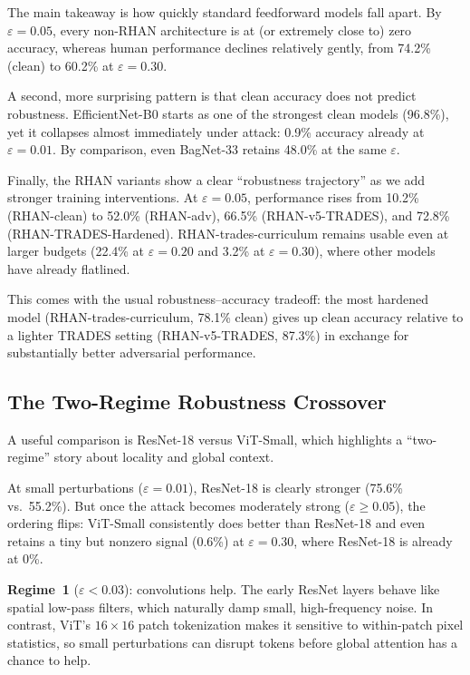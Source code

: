 \documentclass[12pt,a4paper]{article}
\begin{document}
The main takeaway is how quickly standard feedforward models fall apart.
By $\varepsilon{=}0.05$, every non-RHAN architecture is at (or extremely close to)
zero accuracy, whereas human performance declines relatively gently, from 74.2\%
(clean) to 60.2\% at $\varepsilon{=}0.30$.

A second, more surprising pattern is that clean accuracy does not predict
robustness. EfficientNet-B0 starts as one of the strongest clean models (96.8\%),
yet it collapses almost immediately under attack: 0.9\% accuracy already at
$\varepsilon{=}0.01$. By comparison, even BagNet-33 retains 48.0\% at the same
$\varepsilon$.

Finally, the RHAN variants show a clear ``robustness trajectory'' as we add
stronger training interventions. At $\varepsilon{=}0.05$, performance rises from
10.2\% (RHAN-clean) to 52.0\% (RHAN-adv), 66.5\% (RHAN-v5-TRADES), and 72.8\%
(RHAN-TRADES-Hardened). RHAN-trades-curriculum remains usable even at larger
budgets (22.4\% at $\varepsilon{=}0.20$ and 3.2\% at $\varepsilon{=}0.30$), where
other models have already flatlined.

This comes with the usual robustness--accuracy tradeoff: the most hardened model
(RHAN-trades-curriculum, 78.1\% clean) gives up clean accuracy relative to a
lighter TRADES setting (RHAN-v5-TRADES, 87.3\%) in exchange for substantially
better adversarial performance.

\subsection{The Two-Regime Robustness Crossover}

A useful comparison is ResNet-18 versus ViT-Small, which highlights a
``two-regime'' story about locality and global context.

At small perturbations ($\varepsilon{=}0.01$), ResNet-18 is clearly stronger
(75.6\% vs.\ 55.2\%). But once the attack becomes moderately strong
($\varepsilon{\geq}0.05$), the ordering flips: ViT-Small consistently does better
than ResNet-18 and even retains a tiny but nonzero signal (0.6\%) at
$\varepsilon{=}0.30$, where ResNet-18 is already at 0\%.

\textbf{Regime~1} ($\varepsilon < 0.03$): convolutions help. The early ResNet
layers behave like spatial low-pass filters, which naturally damp small,
high-frequency noise. In contrast, ViT's $16{\times}16$ patch tokenization makes
it sensitive to within-patch pixel statistics, so small perturbations can
disrupt tokens before global attention has a chance to help.
\end{document}
